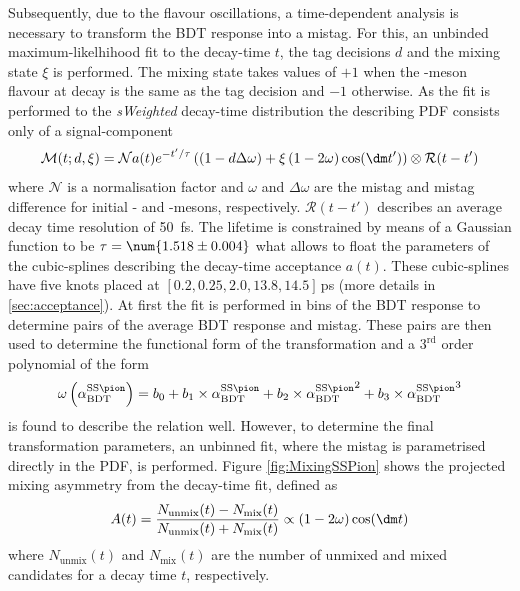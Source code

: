 Subsequently, due to the flavour oscillations, a time-dependent analysis is necessary to transform the BDT response into a mistag.
For this, an unbinded maximum-likelhihood fit to the decay-time $t$, the tag decisions $d$ and the mixing state $\xi$ is performed.
The mixing state takes values of $+1$ when the \B-meson flavour at decay is the same as the tag decision and $-1$ otherwise.
As the fit is performed to the \emph{sWeighted} decay-time distribution the describing PDF consists only of a signal-component
\begin{equation}
\mathcal{M}(t;d,\xi)=\mathcal{N}a(t)e^{-t'/\tau}\left(\left(1-d\Delta\omega\right)+\xi\left(1-2\omega\right)\cos\!\left(\dm t'\right)\right)\otimes\mathcal{R}(t-t')\label{eq:mixPDF}
\end{equation}
where $\mathcal{N}$ is a normalisation factor and $\omega$ and $\Delta\omega$ are the mistag and mistag difference for initial \Bz- and \Bzb-mesons, respectively.
$\mathcal{R}(t-t')$ describes an average decay time resolution of \SI{50}{\femto\second}.
The lifetime is constrained by means of a Gaussian function to be $\tau=\num{1.518\pm0.004}$ what allows to float the parameters of the cubic-splines describing the decay-time acceptance $a(t)$.
These cubic-splines have five knots placed at $[0.2, 0.25, 2.0, 13.8, 14.5]\,$\si{\pico\second} (more details in \cref{sec:acceptance}).
At first the fit is performed in bins of the BDT response to determine pairs of the average BDT response and mistag.
These pairs are then used to determine the functional form of the transformation and a $3^{\text{rd}}$ order polynomial of the form
\begin{equation}
\omega\left(\alpha^{\text{SS}\pion}_\text{BDT}\right)=b_0+b_1\times\alpha^{\text{SS}\pion}_\text{BDT}+b_2\times{\alpha^{\text{SS}\pion}_\text{BDT}}^2+b_3\times{\alpha^{\text{SS}\pion}_\text{BDT}}^3\label{eq:tranformfunc}
\end{equation}
is found to describe the relation well.
However, to determine the final transformation parameters, an unbinned fit, where the mistag is parametrised directly in the PDF, is performed.
Figure \eqref{fig:MixingSSPion} shows the projected mixing asymmetry from the decay-time fit, defined as
\begin{equation}
A(t)=\frac{N_{\text{unmix}}(t)-N_{\text{mix}}(t)}{N_{\text{unmix}}(t)+N_{\text{mix}}(t)}\propto\left(1-2\omega\right)\cos\!\left(\dm t\right)
\end{equation}
where $N_{\text{unmix}}(t)$ and $N_{\text{mix}}(t)$ are the number of unmixed  and mixed \Bz candidates for a decay time $t$, respectively.
